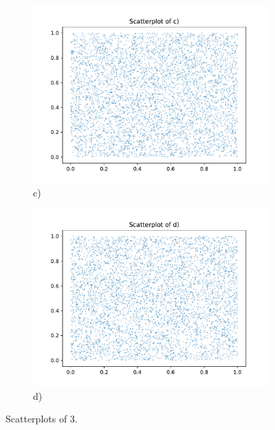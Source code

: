 \begin{figure}
\begin{subfigure}[b]{0.5\textwidth}
          \includegraphics[width=\textwidth]{images/c2d.pdf}
          \caption{c)}
        \end{subfigure}
        \begin{subfigure}[b]{0.5\textwidth}
          \includegraphics[width=\textwidth]{images/d2d.pdf}
          \caption{d)}
        \end{subfigure}
        \caption{Scatterplots of 3.}
        \label{fig:3}
      \end{figure}


\label{sec:auswertung}
